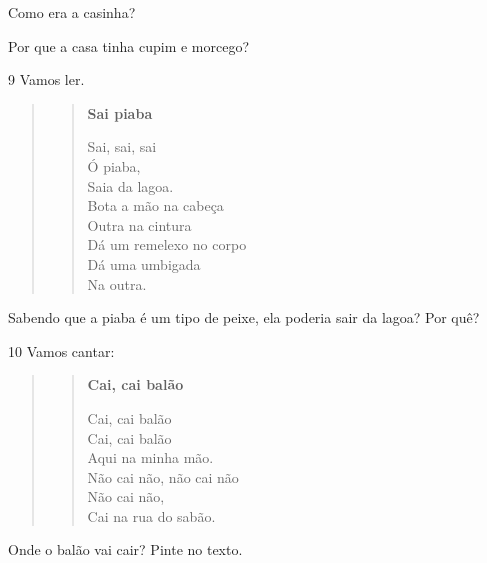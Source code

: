 \begin{escolha}
\item Como era a casinha?


\item Por que a casa tinha cupim e morcego?

\end{escolha}

\num{9} Vamos ler.

\begin{quote}
\begin{verse}
\textbf{Sai piaba}

Sai, sai, sai\\
Ó piaba,\\
Saia da lagoa.\\
Bota a mão na cabeça\\
Outra na cintura\\
Dá um remelexo no corpo\\
Dá uma umbigada\\
Na outra.
\end{verse}

\end{quote}

Sabendo que a piaba é um tipo de peixe, ela poderia sair da lagoa? Por quê?


\num{10} Vamos cantar:

\begin{quote}
\begin{verse}
\textbf{Cai, cai balão}

Cai, cai balão\\
Cai, cai balão\\
Aqui na minha mão.\\
Não cai não, não cai não\\
Não cai não,\\
Cai na rua do sabão.
\end{verse}

\end{quote}

Onde o balão vai cair? Pinte no texto.

